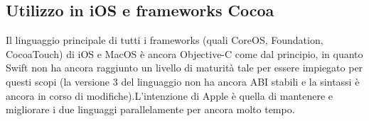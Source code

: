 \subsection{Utilizzo in iOS e frameworks Cocoa}
Il linguaggio principale di tutti i frameworks (quali CoreOS, Foundation, CocoaTouch) di iOS e MacOS è ancora Objective-C come dal principio, in quanto Swift non ha ancora raggiunto un livello di maturità tale per essere impiegato per questi scopi (la versione 3 del linguaggio non ha ancora ABI stabili e la sintassi è ancora in corso di modifiche).L'intenzione di Apple è quella di mantenere e migliorare i due linguaggi parallelamente per ancora molto tempo.